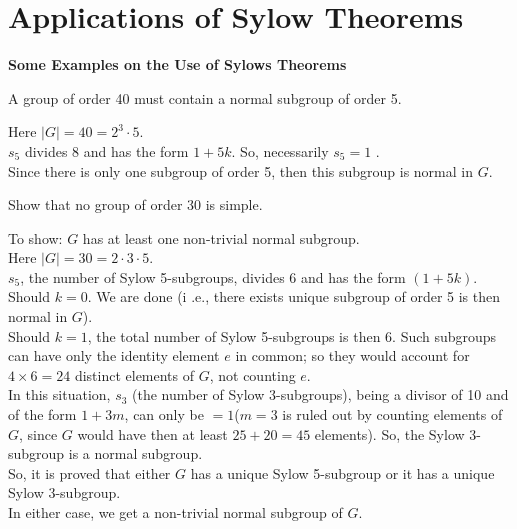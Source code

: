 \documentclass[../main-sheet.tex]{subfiles}
\begin{document}
\chapter{Applications of Sylow Theorems}
\textbf{Some Examples on the Use of Sylows Theorems}\\
\begin{ex}
    A group of order 40 must contain a normal subgroup of order 5.
\end{ex}
\begin{soln}
    Here \(|G| = 40 = 2^3\cdot5\).\\
    \(s_5\) divides 8 and has the form \(1+5k\).
    So, necessarily \(s_5 = 1\) .\\
    Since there is only one subgroup of order 5, then this subgroup is normal in \(G\).
\end{soln}
\begin{ex}
    Show that no group of order 30 is simple.
\end{ex}
\begin{soln}
    To show: \(G\) has at least one non-trivial normal subgroup.\\
Here \(|G| =30 = 2\cdot 3\cdot 5\).\\
\(s_5\), the number of Sylow 5-subgroups, divides 6 and has the form \((1+ 5k)\).
Should \(k = 0\). We are done (i .e., there exists unique subgroup of order 5 is then normal in \(G\)).\\
Should \(k = 1 \), the total number of Sylow 5-subgroups is then 6. Such subgroups can have only the identity element \(e\) in common; so they would account for \(4 \times 6 =24 \) distinct elements of \(G\), not counting \(e \).\\
In this situation, \(s_3\) (the number of Sylow 3-subgroups), being a divisor of 10 and of the form \(1 + 3m\), can only be \(= 1 \)(\(m=3\) is ruled out by counting elements of \(G \), since \(G\) would have then at least \(25 + 20 = 45\) elements). So, the Sylow 3-subgroup is a normal subgroup.\\
So, it is proved that either \(G\) has a unique Sylow 5-subgroup or it has a unique Sylow 3-subgroup.\\
In either case, we get a non-trivial normal subgroup of \(G \).
\end{soln}
\end{document}
